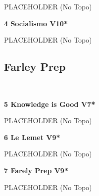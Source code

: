 \begin{multicols}{2}
\begin{minipage}{\linewidth}
					\begin{adjustwidth}{0.5cm}{}				
					PLACEHOLDER
						\newline (No Topo) 
					\end{adjustwidth}
					\end{minipage}
					\begin{minipage}{\linewidth}	
					\label{rt:Socialismo}
\colorbox{red!20}{
\parbox{0.95\textwidth}{
\textbf{
4 Socialismo V10*  
}
}
}

					\begin{adjustwidth}{0.5cm}{}				
					PLACEHOLDER
						\newline (No Topo) 
					\end{adjustwidth}
					\end{minipage}
			\begin{minipage}{\columnwidth}
			\subsection*{Farley Prep}\label{bf:Farley Prep}
			\
			
			\end{minipage}
			
					\begin{minipage}{\linewidth}	
					\label{rt:Knowledge is Good}
\colorbox{Goldenrod!50}{
\parbox{0.95\textwidth}{
\textbf{
5 Knowledge is Good V7*  
}
}
}

					\begin{adjustwidth}{0.5cm}{}				
					PLACEHOLDER
						\newline (No Topo) 
					\end{adjustwidth}
					\end{minipage}
					\begin{minipage}{\linewidth}	
					\label{rt:Le Lemet}
\colorbox{Goldenrod!50}{
\parbox{0.95\textwidth}{
\textbf{
6 Le Lemet V9*  
}
}
}

					\begin{adjustwidth}{0.5cm}{}				
					PLACEHOLDER
						\newline (No Topo) 
					\end{adjustwidth}
					\end{minipage}
					\begin{minipage}{\linewidth}	
					\label{rt:Farely Prep}
\colorbox{Goldenrod!50}{
\parbox{0.95\textwidth}{
\textbf{
7 Farely Prep V9*  
}
}
}

					\begin{adjustwidth}{0.5cm}{}				
					PLACEHOLDER
						\newline (No Topo) 
					\end{adjustwidth}
					\end{minipage}
\end{multicols}
\clearpage